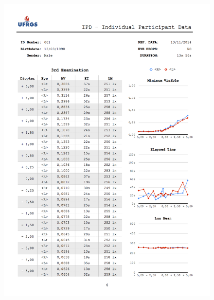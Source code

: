 \begin{figure}[h]
	
	\centering
	\includegraphics[width=1.0\linewidth]{__Images/08/IPD_001_4.png}
\end{figure}

